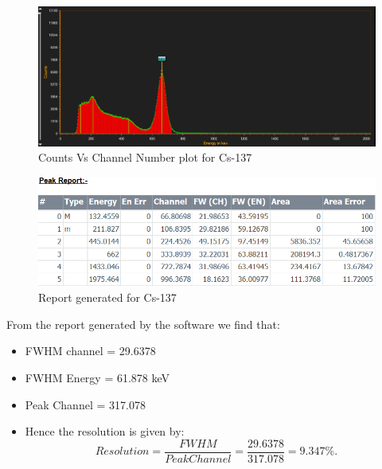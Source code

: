 \documentclass[%
 reprint,
nofootinbib,
 amsmath,amssymb,
 aps,
floatfix,
]{revtex4-2}
\begin{document}
\begin{figure}[H]
    \centering
    \includegraphics[width = 8 cm]{Figures/cs-137.png}
    \caption{Counts Vs Channel Number plot for Cs-137}
    \label{fig:my_label}
\end{figure}
\begin{figure}
    \centering
    \includegraphics[scale = 0.3]{Figures/cs-137-report.PNG}
    \caption{Report generated for Cs-137}
    \label{fig:my_label}
\end{figure}
From the report generated by the software we find that:\\
\begin{itemize}
    \item FWHM channel = 29.6378
    \item FWHM Energy = 61.878 keV
    \item Peak Channel = 317.078
    \item Hence the resolution is given by:
    \begin{dmath*}
        \textit{Resolution} = \frac{FWHM}{Peak Channel} = \frac{29.6378}{317.078}
         = 9.347 \%.
    \end{dmath*}
\end{itemize}
\end{document}
